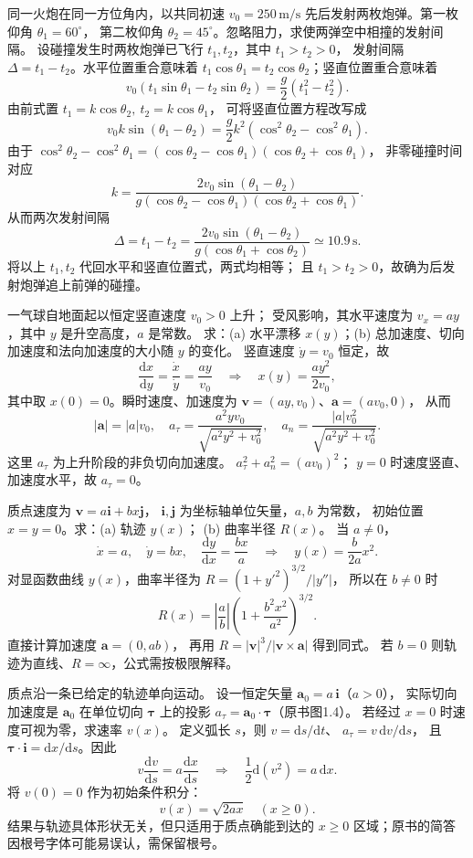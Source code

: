 同一火炮在同一方位角内，以共同初速 $v_0=250\,\mathrm{m/s}$
先后发射两枚炮弹。第一枚仰角 $\theta_1=60^\circ$，
第二枚仰角 $\theta_2=45^\circ$。忽略阻力，求使两弹空中相撞的发射间隔。
\exsolution
设碰撞发生时两枚炮弹已飞行 $t_1,t_2$，其中 $t_1>t_2>0$，
发射间隔 $\Delta=t_1-t_2$。水平位置重合意味着
$t_1\cos\theta_1=t_2\cos\theta_2$；竖直位置重合意味着
\[
 v_0(t_1\sin\theta_1-t_2\sin\theta_2)
 =\frac g2(t_1^2-t_2^2).
\]
由前式置 $t_1=k\cos\theta_2,\ t_2=k\cos\theta_1$，
可将竖直位置方程改写成
\[
 v_0k\sin(\theta_1-\theta_2)
 =\frac g2 k^2(\cos^2\theta_2-\cos^2\theta_1).
\]
由于 $\cos^2\theta_2-\cos^2\theta_1
=(\cos\theta_2-\cos\theta_1)(\cos\theta_2+\cos\theta_1)$，
非零碰撞时间对应
\[
 k=\frac{2v_0\sin(\theta_1-\theta_2)}
 {g(\cos\theta_2-\cos\theta_1)(\cos\theta_2+\cos\theta_1)}.
\]
从而两次发射间隔
\[
 \boxed{\Delta=t_1-t_2=
 \frac{2v_0\sin(\theta_1-\theta_2)}
 {g(\cos\theta_1+\cos\theta_2)}\simeq10.9\,\mathrm s.}
\]
\excheck 将以上 $t_1,t_2$ 代回水平和竖直位置式，两式均相等；
且 $t_1>t_2>0$，故确为后发射炮弹追上前弹的碰撞。


一气球自地面起以恒定竖直速度 $v_0>0$ 上升；
受风影响，其水平速度为 $v_x=ay$，其中 $y$ 是升空高度，$a$ 是常数。
求：(a) 水平漂移 $x(y)$；(b) 总加速度、切向加速度和法向加速度的大小随 $y$ 的变化。
\exsolution
竖直速度 $\dot y=v_0$ 恒定，故
\[
 \frac{\mathrm dx}{\mathrm dy}=\frac{\dot x}{\dot y}=\frac{ay}{v_0}
 \quad\Longrightarrow\quad
 \boxed{x(y)=\frac{ay^2}{2v_0}},
\]
其中取 $x(0)=0$。瞬时速度、加速度为
$\bm v=(ay,v_0)$、$\bm a=(av_0,0)$，
从而
\[
 \boxed{|\bm a|=|a|v_0,\quad
 a_\tau=\frac{a^2yv_0}{\sqrt{a^2y^2+v_0^2}},\quad
 a_n=\frac{|a|v_0^2}{\sqrt{a^2y^2+v_0^2}}.}
\]
这里 $a_\tau$ 为上升阶段的非负切向加速度。
\excheck $a_\tau^2+a_n^2=(av_0)^2$；
$y=0$ 时速度竖直、加速度水平，故 $a_\tau=0$。

质点速度为 $\bm v=a\bm i+bx\bm j$，
$\bm i,\bm j$ 为坐标轴单位矢量，$a,b$ 为常数，
初始位置 $x=y=0$。求：(a) 轨迹 $y(x)$；
(b) 曲率半径 $R(x)$。
\exsolution
当 $a\ne0$，
\[
 \dot x=a,\quad\dot y=bx,\quad
 \frac{\mathrm dy}{\mathrm dx}=\frac{bx}{a}
 \quad\Longrightarrow\quad
 \boxed{y(x)=\frac b{2a}x^2}.
\]
对显函数曲线 $y(x)$，曲率半径为
$R=(1+y'^2)^{3/2}/|y''|$，
所以在 $b\ne0$ 时
\[
 \boxed{R(x)=\left|\frac ab\right|
 \left(1+\frac{b^2x^2}{a^2}\right)^{3/2}.}
\]
\excheck 直接计算加速度 $\bm a=(0,ab)$，
再用 $R=|\bm v|^3/|\bm v\times\bm a|$ 得到同式。
若 $b=0$ 则轨迹为直线、$R=\infty$，公式需按极限解释。

质点沿一条已给定的轨迹单向运动。
设一恒定矢量 $\bm a_0=a\,\bm i$（$a>0$），
实际切向加速度是 $\bm a_0$ 在单位切向 $\bm\tau$
上的投影 $a_\tau=\bm a_0\cdot\bm\tau$（原书图1.4）。
若经过 $x=0$ 时速度可视为零，求速率 $v(x)$。
\exsolution
定义弧长 $s$，则 $v=\mathrm ds/\mathrm dt$、
$a_\tau=v\,\mathrm dv/\mathrm ds$，
且 $\bm\tau\cdot\bm i=\mathrm dx/\mathrm ds$。因此
\[
 v\frac{\mathrm dv}{\mathrm ds}
 =a\frac{\mathrm dx}{\mathrm ds}
 \quad\Longrightarrow\quad
 \frac12\mathrm d(v^2)=a\,\mathrm dx .
\]
将 $v(0)=0$ 作为初始条件积分：
\[
 \boxed{v(x)=\sqrt{2ax}}\quad (x\ge0).
\]
\excheck 结果与轨迹具体形状无关，但只适用于质点确能到达的
$x\ge0$ 区域；原书的简答因根号字体可能易误认，需保留根号。

